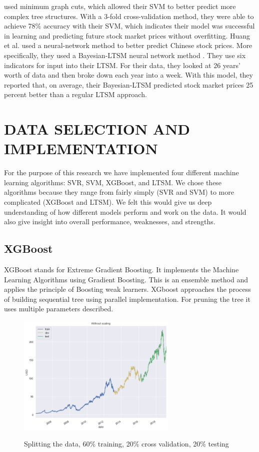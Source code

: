 \usepackage{fancyhdr}\documentclass[conference]{IEEEtran}
\begin{document}
used minimum graph cuts, which allowed their SVM to better predict more complex tree structures. With
a 3-fold cross-validation method, they were able to achieve 78\% accuracy with their SVM, which indicates
their model was successful in learning and predicting future stock market prices without overfitting. Huang et al. used a neural-network method to better predict Chinese stock prices. More specifically, they used a
Bayesian-LTSM neural network method \cite{2}. They use six indicators for input into their LTSM. For their
data, they looked at 26 years’ worth of data and then broke down each year into a week. With this model,
they reported that, on average, their Bayesian-LTSM predicted stock market prices 25 percent better than a
regular LTSM approach.

\section{DATA SELECTION AND IMPLEMENTATION}
For the purpose of this research we have implemented four different machine learning algorithms: SVR, SVM, XGBoost, and LTSM. We chose these algorithms because they range from fairly simply (SVR and SVM) to more complicated (XGBoost and LTSM). We felt this would give us deep understanding of how different models perform and work on the data. It would also give insight into overall performance, weaknesses, and strengths.
\\



\subsection{XGBoost}
XGBoost stands for Extreme Gradient Boosting. It implements the Machine Learning Algorithms using Gradient Boosting. This is an ensemble method and applies the principle of Boosting weak learners. XGboost approaches the process of building sequential tree using parallel implementation. For pruning the tree it uses multiple parameters described.\\
\begin{figure}[h]
    \centering
    {
        \includegraphics[width=3.0in]{partition.png}
        \label{fig:first_sub}
    }
    \caption{Splitting the data, 60\% training, 20\% cross validation, 20\% testing}
    \label{fig:sample_subfigures}
\end{figure}
\end{document}
